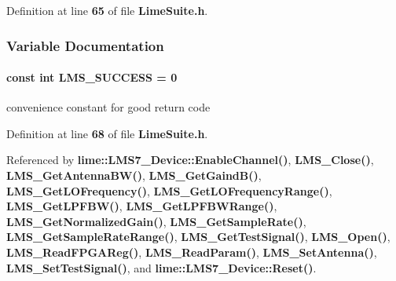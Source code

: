 Definition at line {\bf 65} of file {\bf Lime\+Suite.\+h}.



\subsubsection{Variable Documentation}
\paragraph[{L\+M\+S\+\_\+\+S\+U\+C\+C\+E\+SS}]{\setlength{\rightskip}{0pt plus 5cm}const {\bf int} L\+M\+S\+\_\+\+S\+U\+C\+C\+E\+SS = 0\hspace{0.3cm}{\ttfamily [static]}}\label{LimeSuite_8h_a4e3d4ee762ad993a404cb156d4b00243}


convenience constant for good return code 



Definition at line {\bf 68} of file {\bf Lime\+Suite.\+h}.



Referenced by {\bf lime\+::\+L\+M\+S7\+\_\+\+Device\+::\+Enable\+Channel()}, {\bf L\+M\+S\+\_\+\+Close()}, {\bf L\+M\+S\+\_\+\+Get\+Antenna\+B\+W()}, {\bf L\+M\+S\+\_\+\+Get\+Gaind\+B()}, {\bf L\+M\+S\+\_\+\+Get\+L\+O\+Frequency()}, {\bf L\+M\+S\+\_\+\+Get\+L\+O\+Frequency\+Range()}, {\bf L\+M\+S\+\_\+\+Get\+L\+P\+F\+B\+W()}, {\bf L\+M\+S\+\_\+\+Get\+L\+P\+F\+B\+W\+Range()}, {\bf L\+M\+S\+\_\+\+Get\+Normalized\+Gain()}, {\bf L\+M\+S\+\_\+\+Get\+Sample\+Rate()}, {\bf L\+M\+S\+\_\+\+Get\+Sample\+Rate\+Range()}, {\bf L\+M\+S\+\_\+\+Get\+Test\+Signal()}, {\bf L\+M\+S\+\_\+\+Open()}, {\bf L\+M\+S\+\_\+\+Read\+F\+P\+G\+A\+Reg()}, {\bf L\+M\+S\+\_\+\+Read\+Param()}, {\bf L\+M\+S\+\_\+\+Set\+Antenna()}, {\bf L\+M\+S\+\_\+\+Set\+Test\+Signal()}, and {\bf lime\+::\+L\+M\+S7\+\_\+\+Device\+::\+Reset()}.

